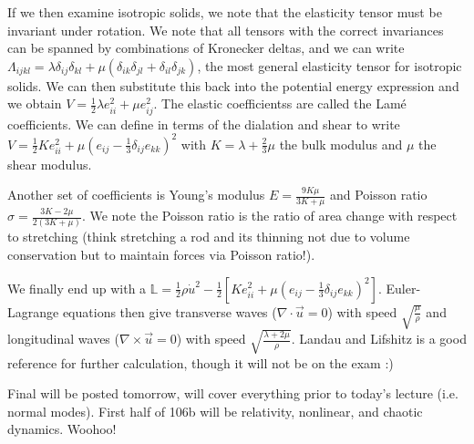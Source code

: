 \documentclass[10pt]{report}
\begin{document}
If we then examine isotropic solids, we note that the elasticity tensor must be invariant under rotation. We note that all tensors with the correct invariances can be spanned by combinations of Kronecker deltas, and we can write $\Lambda_{ijkl} = \lambda \delta_{ij}\delta_{kl} + \mu\left( \delta_{ik}\delta_{jl} + \delta_{il}\delta_{jk} \right)$, the most general elasticity tensor for isotropic solids. We can then substitute this back into the potential energy expression and we obtain $V = \frac{1}{2}\lambda e_{ii}^2 + \mu e_{ij}^2$. The elastic coefficientss are called the Lam\'e coefficients. We can define in terms of the dialation and shear to write $V = \frac{1}{2}Ke^{2}_{ii} + \mu\left( e_{ij} - \frac{1}{3}\delta_{ij}e_{kk} \right)^2$ with $K = \lambda + \frac{2}{3}\mu$ the bulk modulus and $\mu$ the shear modulus. 

Another set of coefficients is Young's modulus $E = \frac{9K\mu}{3K+\mu}$ and Poisson ratio $\sigma = \frac{3K-2\mu}{2(3K+\mu)}$. We note the Poisson ratio is the ratio of area change with respect to stretching (think stretching a rod and its thinning not due to volume conservation but to maintain forces via Poisson ratio!).

We finally end up with a $\mathbb{L} = \frac{1}{2}\rho \dot{u}^2 - \frac{1}{2}\left[ Ke_{ii}^2 + \mu(e_{ij} - \frac{1}{3}\delta_{ij}e_{kk})^2 \right]$. Euler-Lagrange equations then give transverse waves ($\nabla \cdot \vec{u} = 0$) with speed $\sqrt{\frac{\mu}{\rho}}$ and longitudinal waves ($\nabla \times \vec{u} = 0$) with speed $\sqrt{\frac{\lambda + 2\mu}{\rho}}$. Landau and Lifshitz is a good reference for further calculation, though it will not be on the exam :)

Final will be posted tomorrow, will cover everything prior to today's lecture (i.e. normal modes). First half of 106b will be relativity, nonlinear, and chaotic dynamics. Woohoo!
\end{document}
